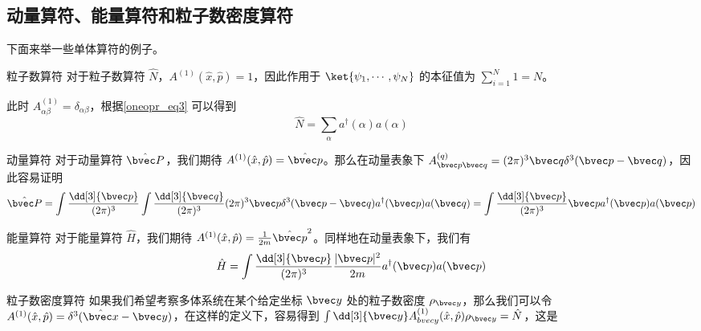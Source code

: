 \subsection{动量算符、能量算符和粒子数密度算符}
下面来举一些单体算符的例子。
\begin{example}{粒子数算符}
对于粒子数算符 $\hat N$，$A^{(1)}(\hat x,\hat p)=1$，因此作用于 $\ket{\psi_1,\cdots,\psi_N}$ 的本征值为 $\sum_{i=1}^N 1=N$。

此时 $A_{\alpha\beta}^{(1)}=\delta_{\alpha\beta}$，根据\autoref{oneopr_eq3} 可以得到
\begin{equation}
\hat N=\sum_{\alpha} a^\dagger(\alpha) a(\alpha)
\end{equation}
\begin{exercise}{动量算符}
对于动量算符 $\hat{\bvec P}$，我们期待 $A^{(1)}(\hat x,\hat p)=\hat{\bvec p}$。那么在动量表象下 $A_{\bvec p\bvec q}^{(q)}=(2\pi)^3 \bvec q \delta^3(\bvec p-\bvec q)$，因此容易证明
\begin{equation}
\begin{aligned}
\hat{\bvec P}=\int\frac{\dd[3]{\bvec p}}{(2\pi)^3} \int\frac{\dd[3]{\bvec q}}{(2\pi)^3} (2\pi)^3 \bvec p \delta^3(\bvec p-\bvec q)a^\dagger(\bvec p)a(\bvec q)=\int\frac{\dd[3]{\bvec p}}{(2\pi)^3} \bvec p a^\dagger(\bvec p)a(\bvec p)
\end{aligned}
\end{equation}
\end{exercise}

\begin{exercise}{能量算符}
对于能量算符 $\hat H$，我们期待 $A^{(1)}(\hat x,\hat p)=\frac{1}{2m}\hat{\bvec p}^2$。同样地在动量表象下，我们有
\begin{equation}
\begin{aligned}
\hat{H}=\int\frac{\dd[3]{\bvec p}}{(2\pi)^3} \frac{|\bvec p|^2}{2m} a^\dagger(\bvec p)a(\bvec p)
\end{aligned}
\end{equation}
\end{exercise}
\end{example}
\begin{exercise}{粒子数密度算符}
如果我们希望考察多体系统在某个给定坐标 $\bvec y$ 处的粒子数密度 $\rho_{\bvec y}$，那么我们可以令 $A^{(1)}(\hat x,\hat p)=\delta^3(\hat{\bvec x}-\bvec y)$，在这样的定义下，容易得到 $\int \dd[3]{\bvec y} A^{(1)}_{\\bvec y}(\hat x,\hat p)\rho_{\bvec y}=\hat N$，这是
\end{exercise}